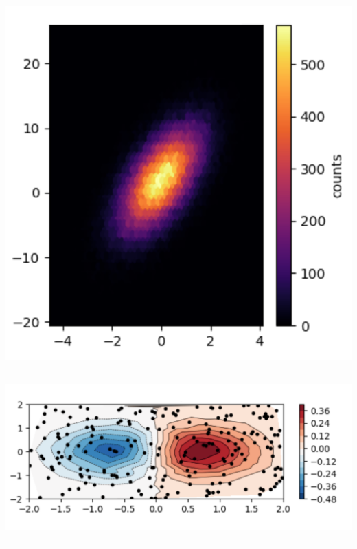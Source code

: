 \begin{code}
    \begin{gridlayout}{\textwidth}{10cm}
        \begin{row}{1}
            \begin{cell}{0.5}
                \centering
                \includegraphics[width=\cellwidth]{doc-one/img/plot-1.png}
                \rule{\cellwidth}{4pt}
            \end{cell}
            \begin{cell}{0.5}
                \centering
                \includegraphics[width=\cellwidth]{doc-one/img/plot-2.png}
                \rule{\cellwidth}{4pt}
            \end{cell}
        \end{row}
    \end{gridlayout}
\end{code}

